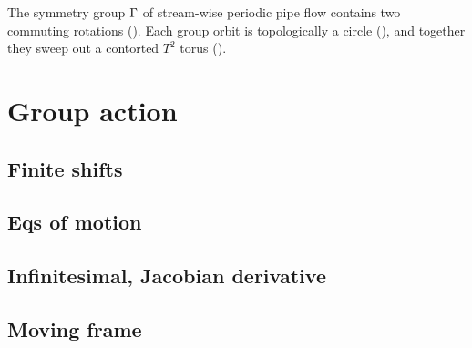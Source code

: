 													\toCB
The symmetry group $\Gamma$ of stream-wise periodic pipe flow contains
two commuting  rotations (). Each
 group orbit is topologically a circle
(), and together they sweep out a contorted
$T^2$ torus ().

\subsection{\CLe}


\section{Group action}

\subsection{Finite shifts}

\subsection{Eqs of motion}
\subsection{Infinitesimal, Jacobian derivative}
\subsection{Moving frame}

